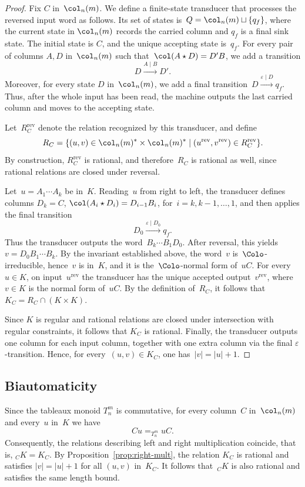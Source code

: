 \documentclass[a4paper, twoside, 11pt, english]{article}
\begin{document}
\begin{proof}
Fix $C$ in~$\col_n(m)$.
We define a finite-state transducer that processes the reversed
input word as follows.
Its set of states is~$Q=\col_n(m)\sqcup\{q_f\}$, where the current state in $\col_n(m)$ records the carried column and $q_f$
is a final sink state.
The initial state is $C$, and the unique accepting state is~$q_f$.
For every pair of columns $A,D$ in~$\col_n(m)$ such that~$\col(A\star D)=D'B$,
we add a transition
\[
D \xrightarrow{A\mid B} D'.
\]
Moreover, for every state $D$ in~$\col_n(m)$, we add a final transition~$D \xrightarrow{\varepsilon\mid D} q_f$.
Thus, after the whole input has been read, the machine outputs the last carried
column and moves to the accepting state.

Let~$R_C^{\mathrm{rev}}$ denote the relation recognized by this transducer, and define
\[
R_C
=
\{(u,v)\in \col_n(m)^*\times \col_n(m)^*
\mid
(u^{\mathrm{rev}},v^{\mathrm{rev}})\in R_C^{\mathrm{rev}}\}.
\]
By construction, $R_C^{\mathrm{rev}}$ is rational, and therefore~$R_C$ is rational as well, since rational relations are closed under reversal.

Let~$u=A_1\cdots A_k$ be in~$K$.
Reading~$u$ from right to left, the transducer defines columns
$D_k=C$, $\col(A_i\star D_i)=D_{i-1}B_i$, for~$i=k,k-1,\dots,1$,
and then applies the final transition
\[
D_0 \xrightarrow{\varepsilon\mid D_0} q_f.
\]
Thus the transducer outputs the word~$B_k\cdots B_1D_0$.
After reversal, this yields~$v=D_0B_1\cdots B_k$.
By the invariant established above, the word~$v$ is~$\Colo$-irreducible, hence~$v$ is in~$K$, and it is the~$\Colo$-normal form of~$uC$.
For every~$u\in K$, on input~$u^{\mathrm{rev}}$ the transducer
has the unique accepted output~$v^{\mathrm{rev}}$, where~$v\in K$
is the normal form of~$uC$.
By the definition of~$R_C$, it follows that~$K_C=R_C\cap(K\times K)$.

Since $K$ is regular and rational relations are closed under intersection with regular constraints, it follows that $K_C$ is rational.
Finally, the transducer outputs one column for each input column, together with one extra column via the final $\varepsilon$-transition.
Hence, for every~$(u,v)\in K_C$, one has~$|v|=|u|+1$.
\end{proof}

\subsection{Biautomaticity}
Since the tableaux monoid $T_n^m$ is commutative, for every column~$C$ in~$\col_n(m)$ and every~$u$ in~$K$ we have
\[
Cu =_{T_n^m} uC.
\]
Consequently, the relations describing left and right multiplication
coincide, that is, ${}_C K = K_C$.
By Proposition~\ref{prop:right-mult}, the relation $K_C$ is rational and
satisfies $|v|=|u|+1$ for all $(u,v)$ in~$K_C$.
It follows that~${}_C K$ is also rational and satisfies the same
length bound.
\end{document}
